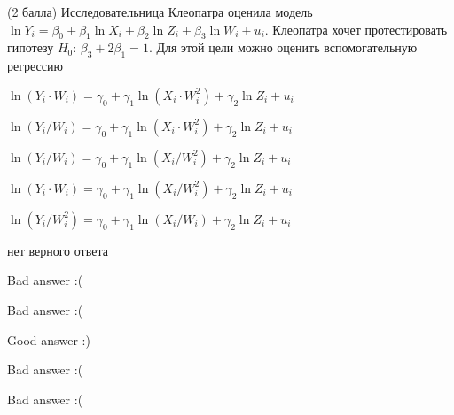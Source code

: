 
\begin{question}
(2 балла) Исследовательница Клеопатра оценила модель
\(\ln Y_i = \beta_0 + \beta_1 \ln X_i + \beta_2 \ln Z_i + \beta_3 \ln W_i + u_i\).
Клеопатра хочет протестировать гипотезу \(H_0\):
\(\beta_3 + 2\beta_1 = 1\). Для этой цели можно оценить вспомогательную
регрессию
\begin{answerlist}[2]
  \item \(\ln(Y_i \cdot W_i) = \gamma_0 + \gamma_1 \ln (X_i \cdot W_i^2) + \gamma_2 \ln Z_i + u_i\)
  \item \(\ln(Y_i/W_i) = \gamma_0 + \gamma_1 \ln (X_i \cdot W_i^2) + \gamma_2 \ln Z_i + u_i\)
  \item \(\ln(Y_i/W_i) = \gamma_0 + \gamma_1 \ln(X_i/W_i^2) + \gamma_2 \ln{Z_i} + u_i\)
  \item \(\ln(Y_i \cdot W_i) = \gamma_0 + \gamma_1 \ln (X_i/W_i^2) + \gamma_2 \ln Z_i + u_i\)
  \item \(\ln(Y_i/W_i^2) = \gamma_0 + \gamma_1 \ln (X_i/W_i) + \gamma_2 \ln Z_i + u_i\)
  \item нет верного ответа
\end{answerlist}
\end{question}

\begin{solution}
\begin{answerlist}
  \item Bad answer :(
  \item Bad answer :(
  \item Good answer :)
  \item Bad answer :(
  \item Bad answer :(
\end{answerlist}
\end{solution}
